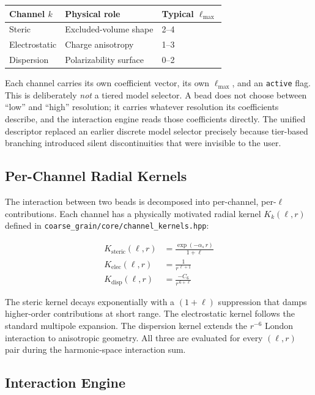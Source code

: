 ﻿\documentclass[11pt]{article}
\newcommand{\file}[1]{\texttt{#1}}
\newcommand{\field}[1]{\texttt{#1}}
\begin{document}
\begin{center}
\begin{tabular}{lll}
\toprule
Channel $k$ & Physical role & Typical $\ell_{\max}$ \\
\midrule
Steric        & Excluded-volume shape  & 2--4 \\
Electrostatic & Charge anisotropy      & 1--3 \\
Dispersion    & Polarizability surface & 0--2 \\
\bottomrule
\end{tabular}
\end{center}

Each channel carries its own coefficient vector, its own $\ell_{\max}$, and
an \field{active} flag. This is deliberately \emph{not} a tiered model
selector. A bead does not choose between ``low'' and ``high'' resolution; it
carries whatever resolution its coefficients describe, and the interaction
engine reads those coefficients directly. The unified descriptor replaced
an earlier discrete model selector precisely because tier-based branching
introduced silent discontinuities that were invisible to the user.
\subsection{Per-Channel Radial Kernels}

The interaction between two beads is decomposed into per-channel, per-$\ell$
contributions. Each channel has a physically motivated radial kernel
$K_k(\ell, r)$ defined in \file{coarse\_grain/core/channel\_kernels.hpp}:

\begin{align}
\label{eq:kernel-steric}
  K_{\mathrm{steric}}(\ell, r)
    &= \frac{\exp(-\alpha_s \, r)}{1 + \ell} \\[4pt]
\label{eq:kernel-elec}
  K_{\mathrm{elec}}(\ell, r)
    &= \frac{1}{r^{\,\ell+1}} \\[4pt]
\label{eq:kernel-disp}
  K_{\mathrm{disp}}(\ell, r)
    &= \frac{-C_6}{r^{\,6+\ell}}
\end{align}

The steric kernel decays exponentially with a $(1+\ell)$ suppression that
damps higher-order contributions at short range. The electrostatic kernel
follows the standard multipole expansion. The dispersion kernel extends the
$r^{-6}$ London interaction to anisotropic geometry. All three are evaluated
for every $(\ell, r)$ pair during the harmonic-space interaction sum.

\subsection{Interaction Engine}
\end{document}
